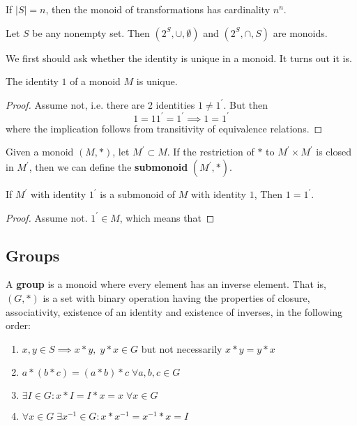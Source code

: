   \begin{theorem}
    If $|S| = n$, then the monoid of transformations has cardinality $n^n$. 
  \end{theorem}

  \begin{example}
    Let $S$ be any nonempty set. Then $(2^S, \cup, \emptyset)$ and $(2^S, \cap, S)$ are monoids. 
  \end{example}

  We first should ask whether the identity is unique in a monoid. It turns out it is. 

  \begin{lemma}
    The identity $1$ of a monoid $M$ is unique. 
  \end{lemma}
  \begin{proof}
    Assume not, i.e. there are 2 identities $1 \neq 1^\prime$. But then 
    \begin{equation}
      1 = 1 1^\prime = 1^\prime \implies 1 = 1^\prime
    \end{equation}
    where the implication follows from transitivity of equivalence relations. 
  \end{proof} 

  \begin{definition}[Submonoid]
    Given a monoid $(M, \ast)$, let $M^\prime \subset M$. If the restriction of $\ast$ to $M^\prime \times M^\prime$ is closed in $M^\prime$, then we can define the \textbf{submonoid} $(M^\prime, \ast)$. 
  \end{definition} 

  \begin{theorem}
    If $M^\prime$ with identity $1^\prime$ is a submonoid of $M$ with identity $1$, Then $1 = 1^\prime$. 
  \end{theorem}
  \begin{proof}
    Assume not. $1^\prime \in M$, which means that 
  \end{proof}

\subsection{Groups}

  \begin{definition}[Group]
    A \textbf{group} is a monoid where every element has an inverse element. That is, $(G, *)$ is a set with binary operation having the properties of closure, associativity, existence of an identity and existence of inverses, in the following order: 
    \begin{enumerate}
      \item $x, y \in S \implies x*y, \;y*x \in G$ but not necessarily $x*y  = y*x$
      \item $a*(b*c) = (a*b)*c \; \forall a, b, c \in G$
      \item $\exists I \in G : x*I = I*x = x \; \forall x \in G $
      \item $\forall x \in G \; \exists x^{-1} \in G : x * x^{-1} = x^{-1} * x = I$
    \end{enumerate}
  \end{definition}

